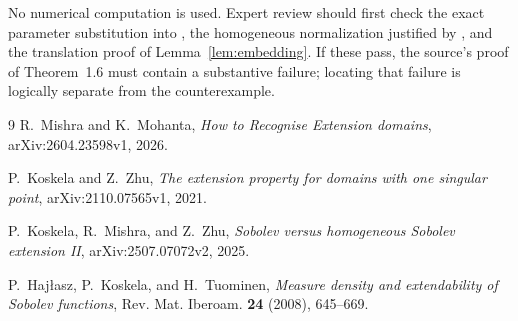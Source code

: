 \documentclass[11pt,a4paper]{article}
\begin{document}
No numerical computation is used. Expert review should first check the exact
parameter substitution into \cite[Theorem~1.2]{KZ}, the homogeneous
normalization justified by \cite[Theorem~1.2]{KMZ}, and the translation proof
of Lemma~\ref{lem:embedding}. If these pass, the source's proof of Theorem~1.6
must contain a substantive failure; locating that failure is logically
separate from the counterexample.

\begin{thebibliography}{9}
R.~Mishra and K.~Mohanta,
\emph{How to Recognise Extension domains}, arXiv:2604.23598v1, 2026.

P.~Koskela and Z.~Zhu,
\emph{The extension property for domains with one singular point},
arXiv:2110.07565v1, 2021.

P.~Koskela, R.~Mishra, and Z.~Zhu,
\emph{Sobolev versus homogeneous Sobolev extension II},
arXiv:2507.07072v2, 2025.

P.~Haj\l asz, P.~Koskela, and H.~Tuominen,
\emph{Measure density and extendability of Sobolev functions},
Rev. Mat. Iberoam. \textbf{24} (2008), 645--669.
\end{thebibliography}
\end{document}
